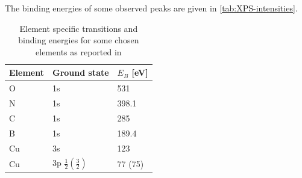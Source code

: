 
The  binding energies of some observed peaks are given in \autoref{tab:XPS-intensities}.
\begin{table}\centering
 \caption{Element specific transitions and binding energies for some chosen elements as reported in \cite{wanger_handbook_1979}}
 \begin{tabular}{lll}
  Element & Ground state & $E_B$ [eV]\\ \hline 
  O & 1s & 531\\
  N & 1s & 398.1\\
  C & 1s & 285\\
  B & 1s & 189.4 \\
  Cu & 3s & 123\\
  Cu & 3p $\frac{1}{2} (\frac{3}{2})$ & 77 (75)\\
 \end{tabular}
\label{tab:XPS-intensities}
\end{table}

